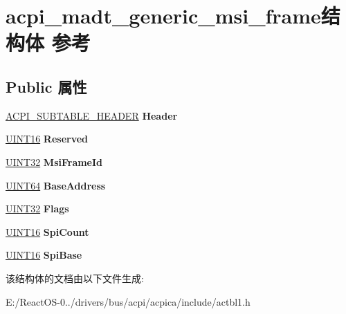 \hypertarget{structacpi__madt__generic__msi__frame}{}\section{acpi\+\_\+madt\+\_\+generic\+\_\+msi\+\_\+frame结构体 参考}
\label{structacpi__madt__generic__msi__frame}
\subsection*{Public 属性}
\begin{DoxyCompactItemize}
\item 
\mbox{\label{structacpi__madt__generic__msi__frame_a12dd5cfbf076b60d25c777b31c0a769b}} 
\hyperlink{structacpi__subtable__header}{A\+C\+P\+I\+\_\+\+S\+U\+B\+T\+A\+B\+L\+E\+\_\+\+H\+E\+A\+D\+ER} {\bfseries Header}
\item 
\mbox{\label{structacpi__madt__generic__msi__frame_a8035befe1b8e32a1f6330c353bae4563}} 
\hyperlink{_processor_bind_8h_a09f1a1fb2293e33483cc8d44aefb1eb1}{U\+I\+N\+T16} {\bfseries Reserved}
\item 
\mbox{\label{structacpi__madt__generic__msi__frame_a586848038102c6e0c8dfcd0eaec32da7}} 
\hyperlink{_processor_bind_8h_ae1e6edbbc26d6fbc71a90190d0266018}{U\+I\+N\+T32} {\bfseries Msi\+Frame\+Id}
\item 
\mbox{\label{structacpi__madt__generic__msi__frame_a3e3d8cc32a01de33e2521afd2f9510be}} 
\hyperlink{_processor_bind_8h_a57be03562867144161c1bfee95ca8f7c}{U\+I\+N\+T64} {\bfseries Base\+Address}
\item 
\mbox{\label{structacpi__madt__generic__msi__frame_a8b622e2d9a51455f9491734f119a52f7}} 
\hyperlink{_processor_bind_8h_ae1e6edbbc26d6fbc71a90190d0266018}{U\+I\+N\+T32} {\bfseries Flags}
\item 
\mbox{\label{structacpi__madt__generic__msi__frame_a3c737e99284f01789e80e16ae624fea6}} 
\hyperlink{_processor_bind_8h_a09f1a1fb2293e33483cc8d44aefb1eb1}{U\+I\+N\+T16} {\bfseries Spi\+Count}
\item 
\mbox{\label{structacpi__madt__generic__msi__frame_aa5ed7a3ee44b6acc04fdf3ff056e09e4}} 
\hyperlink{_processor_bind_8h_a09f1a1fb2293e33483cc8d44aefb1eb1}{U\+I\+N\+T16} {\bfseries Spi\+Base}
\end{DoxyCompactItemize}


该结构体的文档由以下文件生成\+:\begin{DoxyCompactItemize}
\item 
E\+:/\+React\+O\+S-\/0../drivers/bus/acpi/acpica/include/actbl1.\+h\end{DoxyCompactItemize}
